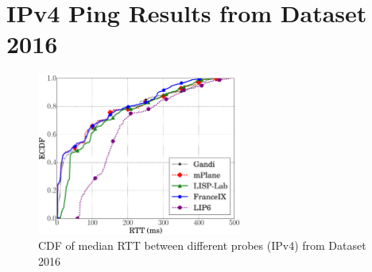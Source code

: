 \section{IPv4 Ping Results from Dataset 2016}
\label{sec:pxtr_ping_v4_2016}


\begin{figure}[!t]
	\centering
	\includegraphics[width=0.6\textwidth]{Pics/v4/CDF_avg(RTT)_median_4_20.eps}
	\caption{CDF of median RTT between different probes (IPv4) from Dataset 2016}
	\label{CDF_of_median_RTT_between_different_probes_v4_2016}
\end{figure}

